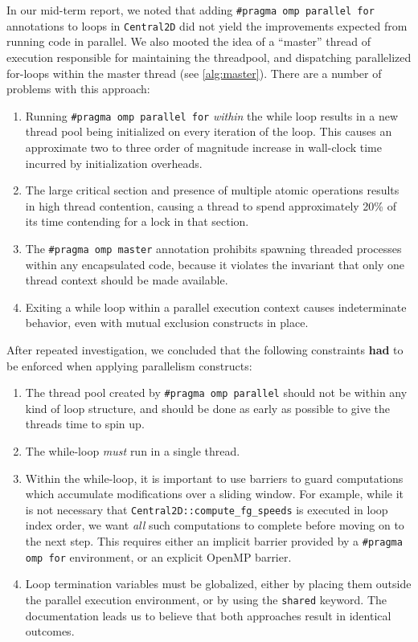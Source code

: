 \documentclass{scrartcl}
\begin{document}
  In our mid-term report, we noted that adding \texttt{\#pragma omp parallel for} annotations to loops in \texttt{Central2D} did not yield the improvements expected from running code in parallel. We also mooted the idea of a ``master'' thread of execution responsible for maintaining the threadpool, and dispatching parallelized for-loops within the master thread (see \autoref{alg:master}). There are a number of problems with this approach:

  \begin{enumerate}
    \item Running \texttt{\#pragma omp parallel for} \emph{within} the while loop results in a new thread pool being initialized on every iteration of the loop. This causes an approximate two to three order of magnitude increase in wall-clock time incurred by initialization overheads.
    \item The large critical section and presence of multiple atomic operations results in high thread contention, causing a thread to spend approximately 20\% of its time contending for a lock in that section.
    \item The \texttt{\#pragma omp master} annotation prohibits spawning threaded processes within any encapsulated code, because it violates the invariant that only one thread context should be made available.
    \item Exiting a while loop within a parallel execution context causes indeterminate behavior, even with mutual exclusion constructs in place.
  \end{enumerate}

  After repeated investigation, we concluded that the following constraints \textbf{had} to be enforced when applying parallelism constructs:

  \begin{enumerate}
    \item The thread pool created by \texttt{\#pragma omp parallel} should not be within any kind of loop structure, and should be done as early as possible to give the threads time to spin up.
    \item The while-loop \emph{must} run in a single thread.
    \item Within the while-loop, it is important to use barriers to guard computations which accumulate modifications over a sliding window. For example, while it is not necessary that \texttt{Central2D::compute\_fg\_speeds} is executed in loop index order, we want \emph{all} such computations to complete before moving on to the next step. This requires either an implicit barrier provided by a \texttt{\#pragma omp for} environment, or an explicit OpenMP barrier.
    \item Loop termination variables must be globalized, either by placing them outside the parallel execution environment, or by using the \texttt{shared} keyword. The documentation leads us to believe that both approaches result in identical outcomes.
  \end{enumerate}
\end{document}
